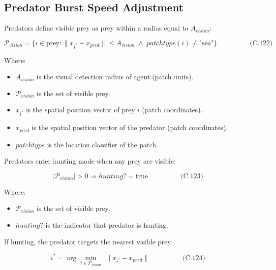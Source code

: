 \documentclass[
]{book}
\providecommand{\tightlist}{%
  \setlength{\itemsep}{0pt}\setlength{\parskip}{0pt}}
\begin{document}
\subsection{Predator Burst Speed Adjustment}\label{predator-burst-speed-adjustment}

Predators define visible prey as prey within a radius equal to
\(A_{vision}\):

\[
\begin{equation} \mathcal{P}_{vision} = \{i \in \text{prey} : \|x_{i^*} - x_{pred}\| \le A_{vision} \;\land\; patchtype(i) \ne \text{"sea"}\}  \hspace{2cm} \text{(C.122)} \end{equation}
\]

Where:

\begin{itemize}
\tightlist
\item
  \(A_{vision}\) is the visual detection radius of agent (patch units).
\item
  \(\mathcal{P}_{vision}\) is the set of visible prey.
\item
  \(x_{i^*}\) is the spatial position vector of prey \(i\) (patch
  coordinates).
\item
  \(x_{pred}\) is the spatial position vector of the predator (patch
  coordinates).
\item
  \(patchtype\) is the location classifier of the patch.
\end{itemize}

Predators enter hunting mode when any prey are visible:

\[
\begin{equation} |\mathcal{P}_{vision}| > 0 \Rightarrow hunting? = \text{true}  \hspace{2cm} \text{(C.123)} \end{equation}
\]

Where:

\begin{itemize}
\tightlist
\item
  \(\mathcal{P}_{vision}\) is the set of visible prey.
\item
  \(hunting?\) is the indicator that predator is hunting.
\end{itemize}

If hunting, the predator targets the nearest visible prey:

\[
\begin{equation} i^* = \arg\min_{i \in \mathcal{P}_{vision}} \; \|x_{i^*} - x_{pred}\|  \hspace{2cm} \text{(C.124)} \end{equation}
\]
\end{document}
